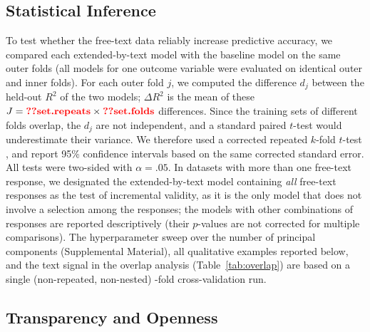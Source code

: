 \documentclass[man,floatsintext]{apa7}
\newcommand{\change}[1]{#1}
\begin{document}
\subsection{Statistical Inference}

\change{To test whether the free-text data reliably increase predictive accuracy, we compared each extended-by-text model with the baseline model on the same outer folds (all models for one outcome variable were evaluated on identical outer and inner folds). For each outer fold $j$, we computed the difference $d_j$ between the held-out $R^2$ of the two models; $\Delta R^2$ is the mean of these $J = \res{set.repeats} \times \res{set.folds}$ differences. Since the training sets of different folds overlap, the $d_j$ are not independent, and a standard paired $t$-test would underestimate their variance. We therefore used a corrected repeated $k$-fold $t$-test \parencite{nadeau2003inference,bouckaert2004evaluating}, and report 95\% confidence intervals based on the same corrected standard error. All tests were two-sided with $\alpha = .05$. In datasets with more than one free-text response, we designated the extended-by-text model containing \emph{all} free-text responses as the test of incremental validity, as it is the only model that does not involve a selection among the responses; the models with other combinations of responses are reported descriptively (their $p$-values are not corrected for multiple comparisons). The hyperparameter sweep over the number of principal components (Supplemental Material)\change{, all qualitative examples reported below, and the text signal in the overlap analysis (Table~\ref{tab:overlap})} are based on a single (non-repeated, non-nested) \res{set.folds}-fold cross-validation run.}

\subsection{Transparency and Openness}
\end{document}
